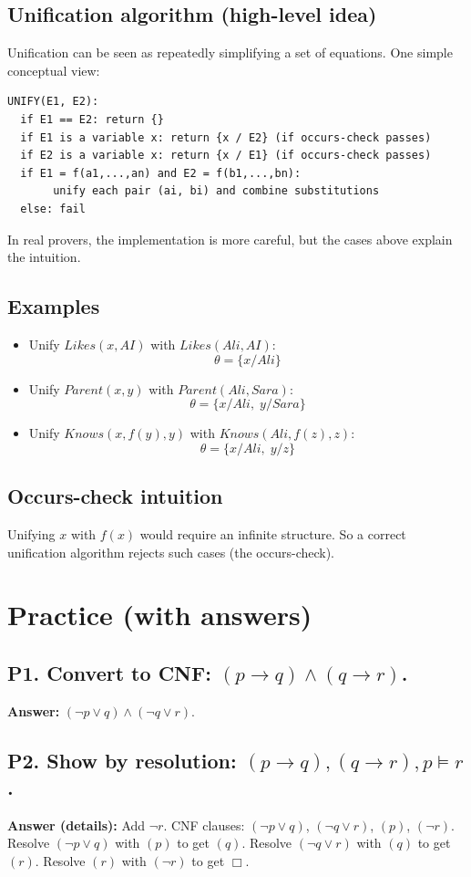 \documentclass[11pt]{article}
\begin{document}
\subsection{Unification algorithm (high-level idea)}
Unification can be seen as repeatedly simplifying a set of equations.
One simple conceptual view:
\begin{lstlisting}
UNIFY(E1, E2):
  if E1 == E2: return {}
  if E1 is a variable x: return {x / E2} (if occurs-check passes)
  if E2 is a variable x: return {x / E1} (if occurs-check passes)
  if E1 = f(a1,...,an) and E2 = f(b1,...,bn):
       unify each pair (ai, bi) and combine substitutions
  else: fail
\end{lstlisting}
In real provers, the implementation is more careful, but the cases above explain the intuition.

\subsection{Examples}
\begin{itemize}[leftmargin=*]
  \item Unify $Likes(x, AI)$ with $Likes(Ali, AI)$:
  \[
    \theta = \{x/Ali\}
  \]
  \item Unify $Parent(x, y)$ with $Parent(Ali, Sara)$:
  \[
     \theta = \{x/Ali,\; y/Sara\}
  \]
  \item Unify $Knows(x, f(y), y)$ with $Knows(Ali, f(z), z)$:
  \[
    \theta = \{x/Ali,\; y/z\}
  \]
\end{itemize}

\subsection{Occurs-check intuition}
Unifying $x$ with $f(x)$ would require an infinite structure. So a correct unification algorithm rejects such cases (the occurs-check).

\section{Practice (with answers)}

\subsection*{P1. Convert to CNF: $(p \rightarrow q) \land (q \rightarrow r)$.}
\textbf{Answer:} $(\lnot p \lor q) \land (\lnot q \lor r)$.

\subsection*{P2. Show by resolution: $(p \rightarrow q), (q \rightarrow r), p \models r$.}
\textbf{Answer (details):} Add $\lnot r$. CNF clauses: $(\lnot p \lor q)$, $(\lnot q \lor r)$, $(p)$, $(\lnot r)$. Resolve $(\lnot p \lor q)$ with $(p)$ to get $(q)$. Resolve $(\lnot q \lor r)$ with $(q)$ to get $(r)$. Resolve $(r)$ with $(\lnot r)$ to get $\Box$.
\end{document}
